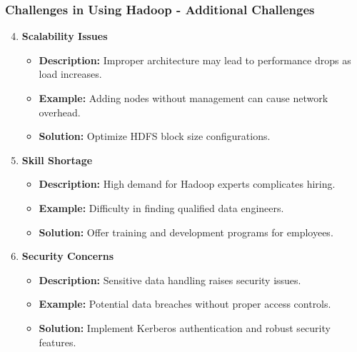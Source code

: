 \documentclass[aspectratio=169]{beamer}
\begin{document}
\begin{frame}[fragile]
    \frametitle{Challenges in Using Hadoop - Additional Challenges}
    \begin{enumerate}
        \setcounter{enumi}{3}
        \item \textbf{Scalability Issues}
            \begin{itemize}
                \item \textbf{Description:} Improper architecture may lead to performance drops as load increases.
                \item \textbf{Example:} Adding nodes without management can cause network overhead.
                \item \textbf{Solution:} Optimize HDFS block size configurations.
            \end{itemize}
        
        \item \textbf{Skill Shortage}
            \begin{itemize}
                \item \textbf{Description:} High demand for Hadoop experts complicates hiring.
                \item \textbf{Example:} Difficulty in finding qualified data engineers.
                \item \textbf{Solution:} Offer training and development programs for employees.
            \end{itemize}

        \item \textbf{Security Concerns}
            \begin{itemize}
                \item \textbf{Description:} Sensitive data handling raises security issues.
                \item \textbf{Example:} Potential data breaches without proper access controls.
                \item \textbf{Solution:} Implement Kerberos authentication and robust security features.
            \end{itemize}
    \end{enumerate}
\end{frame}
\end{document}
